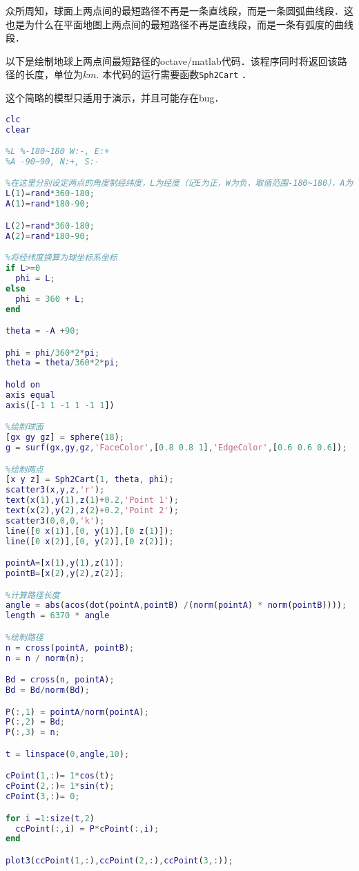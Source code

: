 
众所周知，球面上两点间的最短路径不再是一条直线段，而是一条圆弧曲线段．这也是为什么在平面地图上两点间的最短路径不再是直线段，而是一条有弧度的曲线段．

以下是绘制地球上两点间最短路径的octave/matlab代码．该程序同时将返回该路径的长度，单位为$km$. 本代码的运行需要函数\verb|Sph2Cart| ．

这个简略的模型只适用于演示，并且可能存在bug．%

\begin{lstlisting}[language=matlab]
clc
clear

%L %-180~180 W:-, E:+
%A -90~90, N:+, S:-

%在这里分别设定两点的角度制经纬度，L为经度（记E为正，W为负，取值范围-180~180），A为纬度（记N为正，S为负，取值范围-90~90）．
L(1)=rand*360-180;
A(1)=rand*180-90;

L(2)=rand*360-180;
A(2)=rand*180-90;

%将经纬度换算为球坐标系坐标
if L>=0
  phi = L;
else
  phi = 360 + L;
end

theta = -A +90;

phi = phi/360*2*pi;
theta = theta/360*2*pi;

hold on
axis equal
axis([-1 1 -1 1 -1 1])

%绘制球面
[gx gy gz] = sphere(18);
g = surf(gx,gy,gz,'FaceColor',[0.8 0.8 1],'EdgeColor',[0.6 0.6 0.6]);

%绘制两点
[x y z] = Sph2Cart(1, theta, phi);
scatter3(x,y,z,'r');
text(x(1),y(1),z(1)+0.2,'Point 1');
text(x(2),y(2),z(2)+0.2,'Point 2');
scatter3(0,0,0,'k');
line([0 x(1)],[0, y(1)],[0 z(1)]);
line([0 x(2)],[0, y(2)],[0 z(2)]);

pointA=[x(1),y(1),z(1)];
pointB=[x(2),y(2),z(2)];

%计算路径长度
angle = abs(acos(dot(pointA,pointB) /(norm(pointA) * norm(pointB))));
length = 6370 * angle

%绘制路径
n = cross(pointA, pointB);
n = n / norm(n);

Bd = cross(n, pointA);
Bd = Bd/norm(Bd);

P(:,1) = pointA/norm(pointA);
P(:,2) = Bd;
P(:,3) = n;

t = linspace(0,angle,10);

cPoint(1,:)= 1*cos(t);
cPoint(2,:)= 1*sin(t);
cPoint(3,:)= 0;

for i =1:size(t,2)
  ccPoint(:,i) = P*cPoint(:,i);
end

plot3(ccPoint(1,:),ccPoint(2,:),ccPoint(3,:));

\end{lstlisting}
